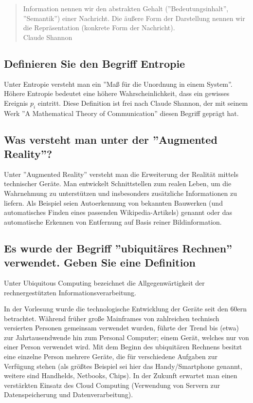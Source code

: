 \begin{quote}
    Information nennen wir den abstrakten Gehalt (''Bedeutungsinhalt'',
    ''Semantik'') einer Nachricht. Die äußere Form der Darstellung
    nennen wir die Repräsentation (konkrete Form der Nachricht). \\

    Claude Shannon
\end{quote}

\subsection{Definieren Sie den Begriff Entropie}

Unter Entropie versteht man ein ''Maß für die Unordnung in einem System''.
Höhere Entropie bedeutet eine höhere Wahrscheinlichkeit, dass ein
gewisses Ereignis $p_i$ eintritt. Diese Definition ist frei nach
Claude Shannon, der mit seinem Werk ''A Mathematical Theory of Communication''
diesen Begriff geprägt hat.

\subsection{Was versteht man unter der ''Augmented Reality''?}

Unter ''Augmented Reality'' versteht man die Erweiterung der Realität
mittels technischer Geräte. Man entwickelt Schnittstellen zum realen
Leben, um die Wahrnehmung zu unterstützen und insbesonders zusätzliche
Informationen zu liefern. Als Beispiel seien Autoerkennung von bekannten
Bauwerken (und automatisches Finden eines passenden Wikipedia-Artikels)
genannt oder das automatische Erkennen von Entfernung auf Basis reiner
Bildinformation.

\subsection{Es wurde der Begriff ''ubiquitäres Rechnen'' verwendet. Geben
    Sie eine Definition}

Unter Ubiquitous Computing bezeichnet die Allgegenwärtigkeit der
rechnergestützten Informationsverarbeitung.

In der Vorlesung wurde
die technologische Entwicklung der Geräte seit den 60ern betrachtet.
Während früher große Mainframes von zahlreichen technisch versierten
Personen gemeinsam verwendet wurden, führte der Trend bis (etwa) zur
Jahrtausendwende hin zum Personal Computer; einem Gerät, welches nur
von einer Person verwendet wird. Mit dem Beginn des ubiquitären Rechnens
besitzt eine einzelne Person mehrere Geräte, die für verschiedene Aufgaben
zur Verfügung stehen (als größtes Beispiel sei hier das Handy/Smartphone
genannt, weitere sind Handhelds, Netbooks, Chips). In der Zukunft
erwartet man einen verstärkten Einsatz des Cloud Computing (Verwendung
von Servern zur Datenspeicherung und Datenverarbeitung).

